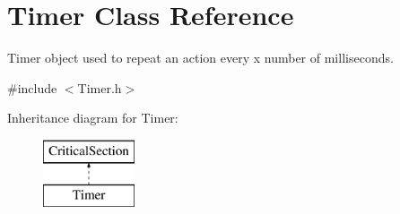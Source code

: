 \hypertarget{class_timer}{
\section{Timer Class Reference}
\label{class_timer}
}


Timer object used to repeat an action every x number of milliseconds.  




{\ttfamily \#include $<$Timer.h$>$}

Inheritance diagram for Timer:\begin{figure}[H]
\begin{center}
\leavevmode
\includegraphics[height=2.000000cm]{class_timer}
\end{center}
\end{figure}
